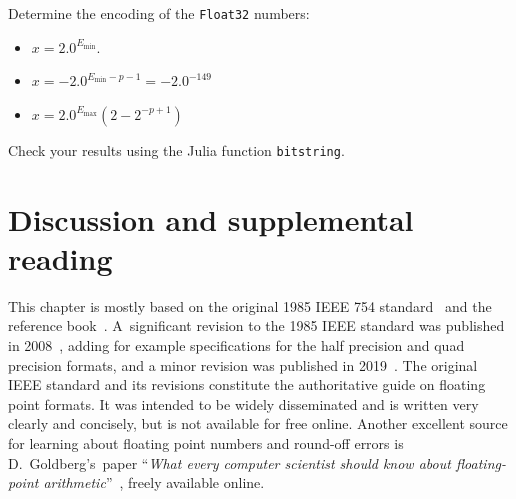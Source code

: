 \begin{exercise}
    Determine the encoding of the \texttt{Float32} numbers:
    \begin{itemize}
        \item $x = 2.0^{E_{\min}}$.
        \item $x = - 2.0^{E_{\min} - p - 1} = - 2.0^{-149}$
        \item $x = 2.0^{E_{\max}} (2-2^{-p+1})$
    \end{itemize}
    Check your results using the Julia function \texttt{bitstring}.
\end{exercise}


\section{Discussion and supplemental reading}%
\label{sec:discussion_and_bibliograhpy}
This chapter is mostly based on the original 1985 IEEE 754 standard~\cite{ieee754} and the reference book~\cite{MR2265914}.
A~significant revision to the 1985 IEEE standard was published in 2008~\cite{ieee2008},
adding for example specifications for the half precision and quad precision formats,
and a minor revision was published in 2019~\cite{ieee2019}.
The original IEEE standard and its revisions constitute the authoritative guide on floating point formats.
It was intended to be widely disseminated and is written very clearly and concisely,
but is not available for free online.
Another excellent source for learning about floating point numbers and round-off errors is D.\ Goldberg's~paper ``\emph{What every computer scientist should know about floating-point arithmetic}''~\cite{goldberg1991every},
freely available online.
